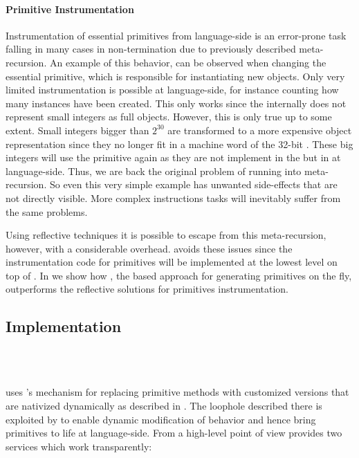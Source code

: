 \paragraph{Primitive Instrumentation}
Instrumentation of essential primitives from lan\-guage-side is an error-prone task falling in many cases in non-termination due to previously described meta-recursion. 
An example of this behavior, can be observed when changing the essential  primitive, which is responsible for instantiating new objects.
Only very limited instrumentation is possible at language-side, for instance counting how many instances have been created.
This only works since the \VM internally does not represent small integers as full objects.
However, this is only true up to some extent.
Small integers bigger than $2^{30}$ are transformed to a more expensive object representation since they no longer fit in a machine word of the 32-bit \VM. 
These big integers will use the  primitive again as they are not implement in the \VM but in at language-side.
Thus, we are back the original problem of running into meta-recursion.
So even this very simple example has unwanted side-effects that are not directly visible.
More complex instructions tasks will inevitably suffer from the same problems.

Using reflective techniques it is possible to escape from this meta-recursion, however, with a considerable overhead.
\WF avoids these issues since the instrumentation code for primitives will be implemented at the lowest level on top of \B.
In  we show how \WF, the \B based approach for generating primitives on the fly, outperforms the reflective solutions for primitives instrumentation. 


\subsection{Implementation}
 \\
 \\

\WF uses \B's mechanism for replacing primitive methods with customized versions that are nativized dynamically as described in .
The loophole described there is exploited by \WF to enable dynamic modification of \VM behavior and hence bring primitives to life at language-side.
From a high-level point of view \WF provides two services which work transparently: 

